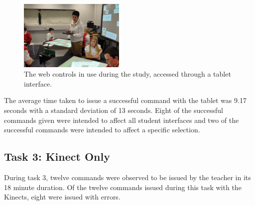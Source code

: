 \documentclass[link]{IWCOMP}
\begin{document}
\begin{figure}[h]
   \centering
   \includegraphics[width=0.45\textwidth]{figures/study_tablet.png}
   \caption{The web controls in use during the study, accessed through a tablet interface.}
   \label{fig:studyTablet}
\end{figure}

The average time taken to issue a successful command with the tablet was 9.17 seconds with a standard deviation of 13 seconds.
Eight of the successful commands given were intended to affect all student interfaces and two of the successful commands were intended to affect a specific selection.

\subsection{Task 3: Kinect Only}
\label{subsec:resultsTask3}

During task 3, twelve commands were observed to be issued by the teacher in its 18 minute duration.
Of the twelve commands issued during this task with the Kinects, eight were issued with errors.
\end{document}
